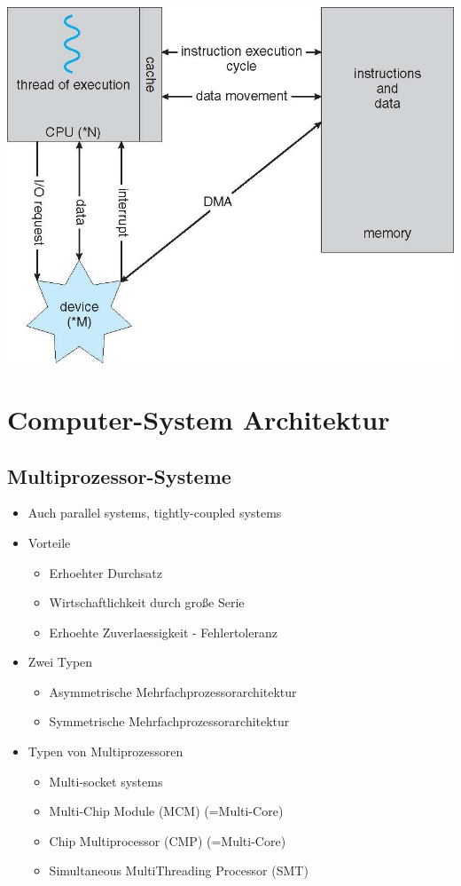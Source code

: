 \documentclass[a4paper]{scrreprt}
\begin{document}
\includegraphics[scale=0.4]{dma.png}

\section{Computer-System Architektur}
\subsection{Multiprozessor-Systeme}
\begin{itemize}
	\item Auch parallel systems, tightly-coupled systems
	\item Vorteile
		\begin{itemize}
			\item Erhoehter Durchsatz
			\item Wirtschaftlichkeit durch große Serie
			\item Erhoehte Zuverlaessigkeit - Fehlertoleranz
		\end{itemize}
	\item Zwei Typen
		\begin{itemize}
			\item Asymmetrische Mehrfachprozessorarchitektur
			\item Symmetrische Mehrfachprozessorarchitektur
		\end{itemize}
	\item Typen von Multiprozessoren
		\begin{itemize}
			\item Multi-socket systems
			\item Multi-Chip Module (MCM) (=Multi-Core)
			\item Chip Multiprocessor (CMP) (=Multi-Core)
			\item Simultaneous MultiThreading Processor (SMT)
		\end{itemize}
\end{itemize}
\end{document}
